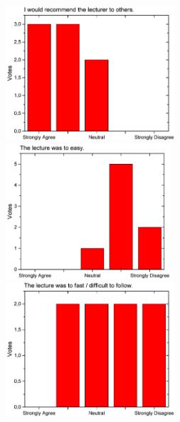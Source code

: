 \begin{figure}[h!]
\begin{minipage}{.48\linewidth}
  \end{minipage}\quad
  \begin{minipage}{.48\linewidth}
    \centering
      {\includegraphics[height=50mm]{figures/n/Graph94.pdf}}
      {\includegraphics[height=50mm]{figures/n/Graph95.pdf}}
      {\includegraphics[height=50mm]{figures/n/Graph96.pdf}}
  \end{minipage}
\end{figure}

